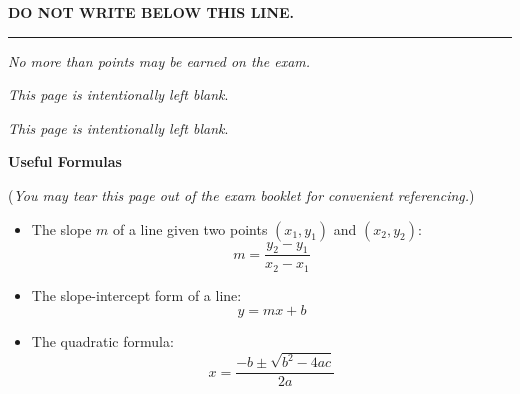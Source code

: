\documentclass[addpoints,12pt,answers]{exam}
\begin{document}
\vspace{1.5cm}

\vfill

\bigskip
\centerline{\textbf{DO NOT WRITE BELOW THIS LINE.}}
\rule{\textwidth}{.2mm}

\vfill

\begin{center}
	\gradetable[v][pages]
	
	\vspace{12pt}
	\textit{No more than \numpoints{} points may be earned on the exam.}
	
\end{center}

\vfill

\newpage
\phantom{.}
\vfill
\begin{center}
   \textit{This page is intentionally left blank}.
\end{center}
\vfill

\newpage
\phantom{.}
\vfill
\begin{center}
   \textit{This page is intentionally left blank}.
\end{center}
\vfill

\newpage

\begin{center}
   {\Large \textbf{Useful Formulas}}
\end{center}

(\textit{You may tear this page out of the exam booklet for convenient referencing.})

\begin{itemize}
   \item The slope $m$ of a line given two points $(x_1,y_1)$ and $(x_2,y_2)$: 
   \[m = \frac{y_2-y_1}{x_2-x_1}\]
   \item The slope-intercept form of a line:
   \[y=mx+b\]
   \item The quadratic formula:
   \[x = \frac{-b\pm\sqrt{b^2-4ac}}{2a}\]
\end{itemize}
\end{document}
